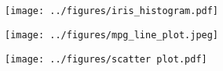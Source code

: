\documentclass{article}
\makeatletter
\newcommand\newlof{%
	\section{\protect\listfigurename}%
	\@mkboth{\MakeUppercase\listfigurename}%
	{\MakeUppercase\listfigurename}%
	\@starttoc{lof}%
}
\makeatother
\begin{document}
 
\listoftables
\clearpage
 
\newlof
\clearpage



\begin{figure}[H]
\centering
\texttt{[image: ../figures/iris\_histogram.pdf]}
\caption{\protect{}}
\end{figure}
\clearpage

\begin{figure}[H]
\centering
\texttt{[image: ../figures/mpg\_line\_plot.jpeg]}
\caption{\protect{}}
\end{figure}
\clearpage

\begin{figure}[H]
\centering
\texttt{[image: ../figures/scatter plot.pdf]}
\caption{\protect{}}
\end{figure}
\clearpage
\end{document}
